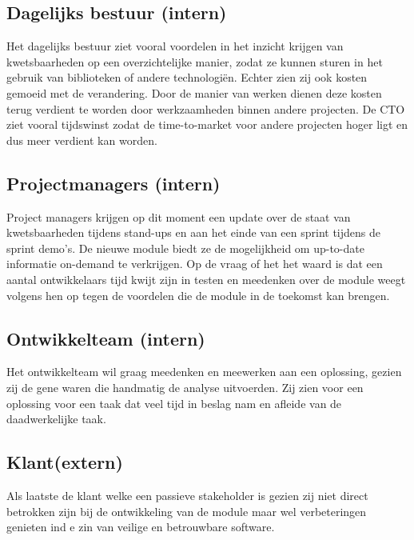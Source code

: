 \subsection{Dagelijks bestuur (intern) }
Het dagelijks bestuur ziet vooral voordelen in het inzicht krijgen van kwetsbaarheden op een overzichtelijke manier, zodat ze kunnen sturen in het gebruik van biblioteken of andere technologi\"en. Echter zien zij ook kosten gemoeid met de verandering. Door de manier van werken dienen deze kosten terug verdient te worden door werkzaamheden binnen andere projecten. De CTO ziet vooral tijdswinst zodat de time-to-market voor andere projecten hoger ligt en dus meer verdient kan worden.

\subsection{Projectmanagers (intern)}
Project managers krijgen op dit moment een update over de staat van kwetsbaarheden tijdens stand-ups en aan het einde van een sprint tijdens de sprint demo's. De nieuwe module biedt ze de mogelijkheid om up-to-date informatie on-demand te verkrijgen. Op de vraag of het het waard is dat een aantal ontwikkelaars tijd kwijt zijn in testen en meedenken over de module weegt volgens hen op tegen de voordelen die de module in de toekomst kan brengen.
\subsection{Ontwikkelteam (intern)}
Het ontwikkelteam wil graag meedenken en meewerken aan een oplossing, gezien zij de gene waren die handmatig de analyse uitvoerden. Zij zien voor een oplossing voor een taak dat veel tijd in beslag nam en afleide van de daadwerkelijke taak.

\subsection{Klant(extern)}
Als laatste de klant welke een passieve stakeholder is gezien zij niet direct betrokken zijn bij de ontwikkeling van de module maar wel verbeteringen genieten ind e zin van veilige en betrouwbare software.

